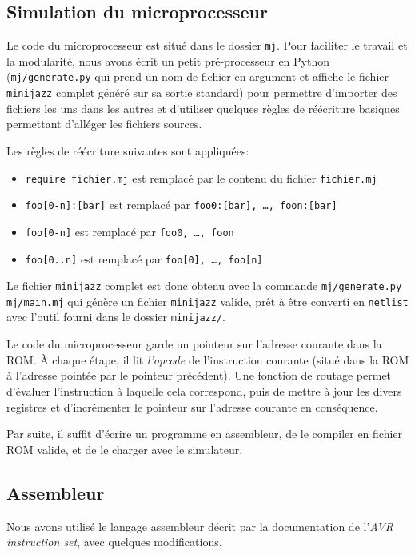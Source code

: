 \documentclass[11pt]{article}
\begin{document}
\subsection{Simulation du microprocesseur}

Le code du microprocesseur est situé dans le dossier \texttt{mj}. Pour faciliter le travail et la modularité, nous avons écrit un petit pré-processeur en Python (\texttt{mj/generate.py} qui prend un nom de fichier en argument et affiche le fichier \texttt{minijazz} complet généré sur sa sortie standard) pour permettre d'importer des fichiers les uns dans les autres et d'utiliser quelques règles de réécriture basiques permettant d'alléger les fichiers sources.

\pagebreak
Les règles de réécriture suivantes sont appliquées:
\begin{itemize}
    \item \texttt{require fichier.mj} est remplacé par le contenu du fichier \texttt{fichier.mj}
    \item \texttt{foo[0-n]:[bar]} est remplacé par \texttt{foo0:[bar], \dots, foon:[bar]}
    \item \texttt{foo[0-n]} est remplacé par \texttt{foo0, \dots, foon}
    \item \texttt{foo[0..n]} est remplacé par \texttt{foo[0], \dots, foo[n]}
\end{itemize}

Le fichier \texttt{minijazz} complet est donc obtenu avec la commande \texttt{mj/generate.py mj/main.mj} qui génère un fichier \texttt{minijazz} valide, prêt à être converti en \texttt{netlist} avec l'outil fourni dans le dossier \texttt{minijazz/}.

Le code du microprocesseur garde un pointeur sur l'adresse courante dans la ROM. À chaque étape, il lit \emph{l'opcode} de l'instruction courante (situé dans la ROM à l'adresse pointée par le pointeur précédent). Une fonction de routage permet d'évaluer l'instruction à laquelle cela correspond, puis de mettre à jour les divers registres et d'incrémenter le pointeur sur l'adresse courante en conséquence.

Par suite, il suffit d'écrire un programme en assembleur, de le compiler en fichier ROM valide, et de le charger avec le simulateur.

\subsection{Assembleur}

Nous avons utilisé le langage assembleur décrit par la documentation de l'\emph{AVR instruction set}, avec quelques modifications.
\end{document}
